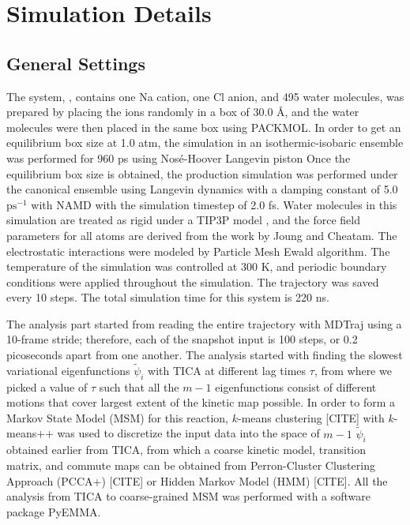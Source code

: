 \section{Simulation Details}
\begin{spacing}{2.0}
    \subsection{General Settings}

    The system, , contains one Na cation, one Cl anion, and 495 water molecules, was prepared by placing the ions randomly in a 
    box of 30.0 \r{A}, and the water molecules were then placed in the same box using PACKMOL. \cite{P-JCompChem-2009-v30-Martinez} In order to 
    get an equilibrium box size at 1.0 atm, the simulation in an isothermic-isobaric ensemble was performed for 960 ps using Nos\'{e}-Hoover 
    Langevin piston \cite{P-JChemPhys-1994-v101-Martyna, P-JChemPhys-1995-v103-Feller} Once the equilibrium box size is obtained, the production 
    simulation was performed under the canonical ensemble using Langevin dynamics with a damping constant of 5.0 $\mathrm{ps}^{-1}$ with NAMD 
    \cite{P-JCompChem-2005-v26-Phillips} with the simulation timestep of 2.0 fs. Water molecules in this simulation are treated as rigid under a 
    TIP3P model \cite{P-JChemPhys-1983-v79-Jorgensen}, and the force field parameters for all atoms are derived from the work by Joung and Cheatam. 
    \cite{P-JPhysChemB-2008-v112-Joung} The electrostatic interactions were modeled by Particle Mesh Ewald \cite{P-JChemPhys-1993-v98-Darden} 
    algorithm. The temperature of the simulation was controlled at 300 K, and periodic boundary conditions were applied throughout the simulation.
    The trajectory was saved every 10 steps. The total simulation time for this system is 220 ns.

    The analysis part started from reading the entire trajectory with MDTraj \cite{P-BiophysJ-2015-v109-McGibbon} using a 10-frame stride; therefore,
    each of the snapshot input is 100 steps, or 0.2 picoseconds apart from one another. The analysis started with finding the slowest 
    variational eigenfunctions $\tilde{\psi}_i$ with TICA at different lag times $\tau$, from where we picked a value of $\tau$ such that 
    all the $m-1$ eigenfunctions consist of different motions that cover largest extent of the kinetic map possible. In order to form a Markov
    State Model (MSM) for this reaction, $k$-means clustering [CITE] with $k$-means++ was used to discretize the input data into the space of 
    $m-1$ $\tilde{\psi}_i$ obtained earlier from TICA, from which a coarse kinetic model, transition matrix, and commute maps can be obtained 
    from Perron-Cluster Clustering Approach (PCCA+) [CITE] or Hidden Markov Model (HMM) [CITE]. All the analysis from TICA to coarse-grained
    MSM was performed with a software package PyEMMA. \cite{P-JCTC-2015-v11-Scherer}


\end{spacing}
